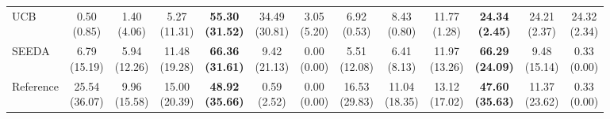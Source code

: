 {\begin{tabular}{l|cccccc|cccccc}
UCB & \makecell{0.50 \\ (0.85)} & \makecell{1.40 \\ (4.06)} & \makecell{5.27 \\ (11.31)} & {\cellcolor[HTML]{C8E6C9}} \bfseries \makecell{55.30 \\ (31.52)} & \makecell{34.49 \\ (30.81)} & \makecell{3.05 \\ (5.20)} & \makecell{6.92 \\ (0.53)} & \makecell{8.43 \\ (0.80)} & \makecell{11.77 \\ (1.28)} & {\cellcolor[HTML]{C8E6C9}} \bfseries \makecell{24.34 \\ (2.45)} & \makecell{24.21 \\ (2.37)} & \makecell{24.32 \\ (2.34)} \\
SEEDA & \makecell{6.79 \\ (15.19)} & \makecell{5.94 \\ (12.26)} & \makecell{11.48 \\ (19.28)} & {\cellcolor[HTML]{C8E6C9}} \bfseries \makecell{66.36 \\ (31.61)} & \makecell{9.42 \\ (21.13)} & \makecell{0.00 \\ (0.00)} & \makecell{5.51 \\ (12.08)} & \makecell{6.41 \\ (8.13)} & \makecell{11.97 \\ (13.26)} & {\cellcolor[HTML]{C8E6C9}} \bfseries \makecell{66.29 \\ (24.09)} & \makecell{9.48 \\ (15.14)} & \makecell{0.33 \\ (0.00)} \\
Reference & \makecell{25.54 \\ (36.07)} & \makecell{9.96 \\ (15.58)} & \makecell{15.00 \\ (20.39)} & {\cellcolor[HTML]{C8E6C9}} \bfseries \makecell{48.92 \\ (35.66)} & \makecell{0.59 \\ (2.52)} & \makecell{0.00 \\ (0.00)} & \makecell{16.53 \\ (29.83)} & \makecell{11.04 \\ (18.35)} & \makecell{13.12 \\ (17.02)} & {\cellcolor[HTML]{C8E6C9}} \bfseries \makecell{47.60 \\ (35.63)} & \makecell{11.37 \\ (23.62)} & \makecell{0.33 \\ (0.00)} \\

\end{tabular}}
